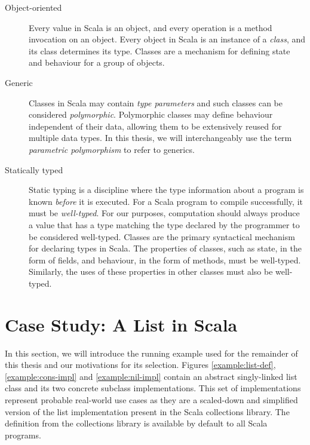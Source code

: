 \begin{description}
	\item[Object-oriented] 
	Every value in Scala is an object, and every operation is a method invocation on an object. 
	Every object in Scala is an instance of a \textit{class}, and its class determines its type.
	Classes\cite{simula:classes} are a mechanism for defining state and behaviour for a group of objects.	
	
	\item[Generic] 
	Classes in Scala may contain \textit{type parameters} and such classes can be considered \textit{polymorphic}\cite{strachey:fundamental-concepts}.
	Polymorphic classes may define behaviour independent of their data, allowing them to be extensively reused for multiple data types.
	In this thesis, we will interchangeably use the term \textit{parametric polymorphism} to refer to generics.
	
	\item[Statically typed] 
	Static typing is a discipline where the type information about a program is known \textit{before} it is executed.
	For a Scala program to compile successfully, it must be \textit{well-typed}.
	For our purposes, computation should always produce a value that has a type matching the type declared by the programmer to be considered well-typed.
	Classes are the primary syntactical mechanism for declaring types in Scala. 
	The properties of classes, such as state, in the form of fields, and behaviour, in the form of methods, must be well-typed.
	Similarly, the uses of these properties in other classes must also be well-typed. 
\end{description}

\section{Case Study: A List in Scala}

In this section, we will introduce the running example used for the remainder of this thesis and our motivations for its selection.
Figures \ref{example:list-def}, \ref{example:cons-impl} and \ref{example:nil-impl} contain an abstract singly-linked list class and its two concrete subclass implementations. 
This set of  implementations represent probable real-world use cases as they are a scaled-down and simplified version of the list implementation present in the Scala collections library.
The  definition from the collections library is available by default to all Scala programs.

